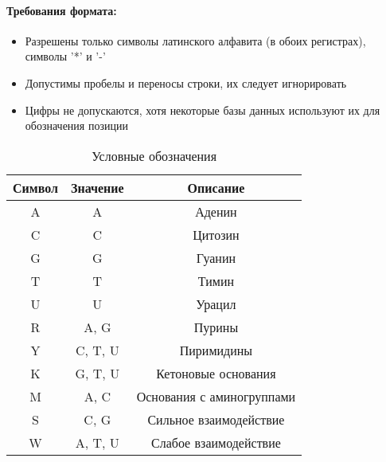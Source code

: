 \documentclass{article}
\begin{document}
                    \paragraph{Требования формата:}
                        \begin{itemize}
                          \item Разрешены только символы латинского алфавита (в обоих регистрах), символы '*' и '-'
                          \item Допустимы пробелы и переносы строки, их следует игнорировать
                          \item Цифры не допускаются, хотя некоторые базы данных используют их для обозначения позиции
                        \end{itemize}
                        \begin{table}[h]
                            \caption{Условные обозначения}
                            \label{tabular:CharMeanings}
                            \begin{center}
                                \begin{tabular}{|c|c|c|}
                                    \hline
                                    Символ & Значение & Описание \\
                                    \hline
                                    A & A             & Аденин \\
                                    C & C             & Цитозин \\
                                    G & G             & Гуанин \\
                                    T & T             & Тимин \\
                                    U & U             & Урацил \\
                                    R & A, G          & Пурины \\
                                    Y & C, T, U       & Пиримидины \\
                                    K & G, T, U       & Кетоновые основания \\
                                    M & A, C          & Основания с аминогруппами \\
                                    S & C, G          & Сильное взаимодействие \\
                                    W & A, T, U       & Слабое взаимодействие \\

\end{tabular}
\end{center}
\end{table}
\end{document}
